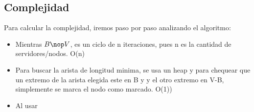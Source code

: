 \subsection{Complejidad}

Para calcular la complejidad, iremos paso por paso analizando el algoritmo:


\begin{itemize}
\item Mientras $B \nop V$, es un ciclo de n iteraciones, pues n es la cantidad de servidores/nodos. O(n)
\item Para buscar la arista de longitud minima, se usa un heap y para chequear que un extremo de la arista elegida este en B y y el otro extremo en V-B, simplemente se marca el nodo como marcado. O(1))
\item Al usar 
\end{itemize}  %
